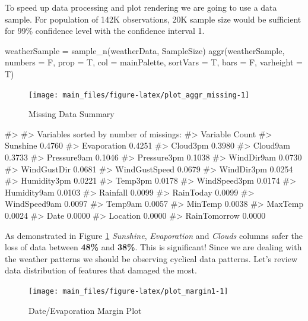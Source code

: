 To speed up data processing and plot rendering we are going to use a
data sample. For population of 142K observations, 20K sample size would
be sufficient for 99\% confidence level with the confidence interval 1.

\begin{Schunk}
\begin{Sinput}
weatherSample = sample_n(weatherData, SampleSize)
aggr(weatherSample, numbers = F, prop = T, col = mainPalette, sortVars = T, bars = F, varheight = T)
\end{Sinput}
\begin{figure}[H]

{\centering \texttt{[image: main\_files/figure-latex/plot\_aggr\_missing-1]} 

}

\caption[Missing Data Summary]{Missing Data Summary}\label{fig:plot_aggr_missing}
\end{figure}
\begin{Soutput}
#> 
#>  Variables sorted by number of missings: 
#>       Variable  Count
#>       Sunshine 0.4760
#>    Evaporation 0.4251
#>       Cloud3pm 0.3980
#>       Cloud9am 0.3733
#>    Pressure9am 0.1046
#>    Pressure3pm 0.1038
#>     WindDir9am 0.0730
#>    WindGustDir 0.0681
#>  WindGustSpeed 0.0679
#>     WindDir3pm 0.0254
#>    Humidity3pm 0.0221
#>        Temp3pm 0.0178
#>   WindSpeed3pm 0.0174
#>    Humidity9am 0.0103
#>       Rainfall 0.0099
#>      RainToday 0.0099
#>   WindSpeed9am 0.0097
#>        Temp9am 0.0057
#>        MinTemp 0.0038
#>        MaxTemp 0.0024
#>           Date 0.0000
#>       Location 0.0000
#>   RainTomorrow 0.0000
\end{Soutput}
\end{Schunk}

As demonstrated in Figure \ref{fig:plot_aggr_missing} \emph{Sunshine},
\emph{Evaporation} and \emph{Clouds} columns safer the loss of data
between \textbf{48\%} and \textbf{38\%}. This is significant! Since we
are dealing with the weather patterns we should be observing cyclical
data patterns. Let's review data distribution of features that damaged
the most.

\begin{Schunk}
\begin{figure}[H]

{\centering \texttt{[image: main\_files/figure-latex/plot\_margin1-1]} 

}

\caption[Date/Evaporation Margin Plot]{Date/Evaporation Margin Plot}\label{fig:plot_margin1}
\end{figure}
\end{Schunk}

